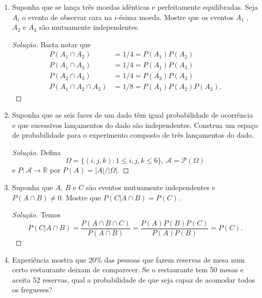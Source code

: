 \documentclass[../Notas.tex]{subfiles}
\begin{document}
\begin{enumerate}
\begin{proof}[Solução]
\begin{enumerate}[a)]
            \item $P(D|P) = \dfrac{P(P|D)P(D)}{P(P|D)P(D) + P(P|D^c)P(D^c)} 
                          = \dfrac{0,9\cdot 0,01}{0,9\cdot 0,01 + 0,05\cdot 0,99}
                          = 2/13$.
        \end{enumerate}
    \end{proof}
    \item Suponha que se lança três moedas idênticas e perfeitamente equilibradas. Seja $A_i$ o evento de observar cara na $i$-ésima moeda. Mostre que os eventos $A_1$ , $A_2$ e $A_3$ são mutuamente independentes.
    \begin{proof}[Solução]
        Basta notar que
        \begin{align*}
            P(A_1\cap A_2) &= 1/4 = P(A_1)P(A_2) \\
            P(A_1\cap A_3) &= 1/4 = P(A_1)P(A_3) \\
            P(A_2\cap A_3) &= 1/4 = P(A_3)P(A_3) \\
            P(A_1\cap A_2\cap A_3) &= 1/8 = P(A_1)P(A_2)P(A_3).
        \end{align*}
    \end{proof}
    \item Suponha que as seis faces de um dado têm igual probabilidade de ocorrência e que sucessivos lançamentos do dado são independentes. Construa um espaço de probabilidade para o experimento composto de três lançamentos do dado.
    \begin{proof}[Solução]
        Defina
        \[
        \Omega = \{ (i,j,k) : 1\leq i,j,k\leq 6 \}, 
        \, \mathcal{A} = \mathcal{P}(\Omega)
        \]
        e $P:\mathcal{A}\to\mathbb{R}$ por $P(A) = |A|/|\Omega|$.
    \end{proof}
    \item Suponha que $A$, $B$ e $C$ são eventos mutuamente independentes e $P(A \cap B) \neq 0$. Mostre que $P(C|A \cap B) = P(C)$.
    \begin{proof}[Solução]
        Temos
        \[
        P(C|A\cap B) = \frac{P(A\cap B\cap C)}{P(A\cap B)} = \frac{P(A)P(B)P(C)}{P(A)P(B)} = P(C).
        \]
    \end{proof}
    \item Experiência mostra que 20\% das pessoas que fazem reservas de mesa num certo restaurante deixam de comparecer. Se o restaurante tem 50 mesas e aceita 52 reservas, qual a probabilidade de que seja capaz de acomodar todos os fregueses?

\end{enumerate}
\end{document}
